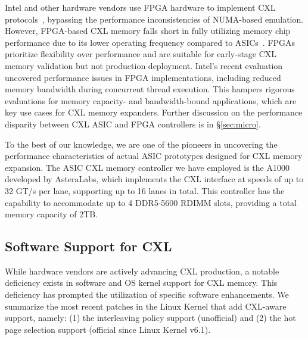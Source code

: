  Intel and other hardware vendors use FPGA hardware to implement CXL protocols~\cite{intelfpga}, bypassing the performance inconsistencies of NUMA-based emulation. However, FPGA-based CXL memory falls short in fully utilizing memory chip performance due to its lower operating frequency compared to ASICs~\cite{fpgaasic}. FPGAs prioritize flexibility over performance and are suitable for early-stage CXL memory validation but not production deployment. Intel's recent evaluation~\cite{demystify} uncovered performance issues in FPGA implementations, including reduced memory bandwidth during concurrent thread execution. This hampers rigorous evaluations for memory capacity- and bandwidth-bound applications, which are key use cases for CXL memory expanders. Further discussion on the performance disparity between CXL ASIC and FPGA controllers is in \S\ref{sec:micro}.

To the best of our knowledge, we are one of the pioneers in uncovering the performance characteristics of actual ASIC prototypes designed for CXL memory expansion. The ASIC CXL memory controller we have employed is the A1000~\cite{A1000} developed by AsteraLabs, which implements the CXL interface at speeds of up to 32 GT/s per lane, supporting up to 16 lanes in total. This controller has the capability to accommodate up to 4 DDR5-5600 RDIMM slots, providing a total memory capacity of 2TB.



\subsection{Software Support for CXL}

\label{ssec:cxlsoftware}

While hardware vendors are actively advancing CXL production, a notable deficiency exists in software and OS kernel support for CXL memory. This deficiency has prompted the utilization of specific software enhancements. We summarize the most recent patches in the Linux Kernel that add CXL-aware support, namely: (1) the interleaving policy support (unofficial) and (2) the hot page selection support (official since Linux Kernel v6.1).


